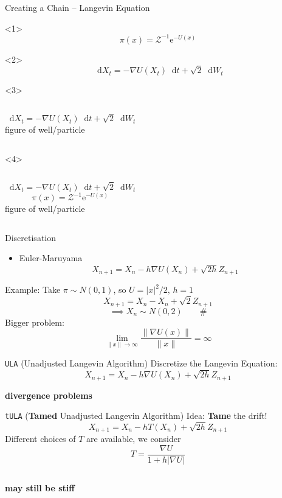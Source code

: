 \documentclass[aspectratio=169]{beamer}
\newcommand{\dif}{\mathop{}\!\mathrm{d}}
\newcommand{\e}{\mathrm{e}}
\newcommand{\grad}{\nabla}
\begin{document}
\begin{frame}{Creating a Chain -- Langevin Equation}
\begin{onlyenv}<1>
    $$\pi(x)=\mathcal{Z}^{-1} \e^{-U(x)} $$
\end{onlyenv}
\begin{onlyenv}<2>
    $$\dif X_t = -\grad U(X_t) \dif t +\sqrt{2}\dif W_t $$
\end{onlyenv}
\begin{onlyenv}<3>
\begin{columns}
    $$\dif X_t = -\grad U(X_t) \dif t +\sqrt{2}\dif W_t $$
figure of well/particle
\end{columns}
\end{onlyenv}
\begin{onlyenv}<4>
\begin{columns}
    $$\dif X_t = -\grad U(X_t) \dif t +\sqrt{2}\dif W_t $$
        $$\pi(x)=\mathcal{Z}^{-1} \e^{-U(x)} $$
figure of well/particle
\end{columns}
\end{onlyenv}
\end{frame}

\begin{frame}{Discretisation}

    \begin{itemize}
        \item Euler-Maruyama  \[X_{n+1} = X_n - h\grad U(X_n)  + \sqrt{2h}Z_{n+1}\]
    \end{itemize}
    \pause
    Example: Take \(\pi\sim N(0,1)\), so $U=|x| ^2/2,\, h=1$ \\
    \pause 
    $$X_{n+1} =X_n - X_n +\sqrt{2}Z_{n+1} $$
    \pause 
    $$\implies X_n \sim N(0,2)\qquad \# $$
 \pause
 Bigger problem:
 \[\lim_{\lVert x\rVert \to \infty}\frac{\lVert \grad U(x)\rVert }{\lVert x \rVert} = \infty  \]

\end{frame}

\begin{frame}{\texttt{ULA} (Unadjusted Langevin Algorithm)}
    Discretize the Langevin Equation:
     \[X_{n+1} = X_n - h\grad U(X_n)  + \sqrt{2h}Z_{n+1}\]
     \[\]
     \[\]
      \centerline{\textbf{divergence problems}}
\end{frame}

\begin{frame}{\texttt{tULA} (\textbf{Tamed} Unadjusted Langevin Algorithm)}
Idea: \textbf{Tame} the drift!
\[ X_{n+1} = X_n -hT(X_n) +\sqrt{2h}Z_{n+1} \]
Different choices of \(T\) are available, we consider 
\[T=\frac{\grad U }{1+h|\grad U|}\]
    
   \[\]
   \[\]
   \centerline{\textbf{may still be stiff}}
      
\end{frame}
\end{document}
